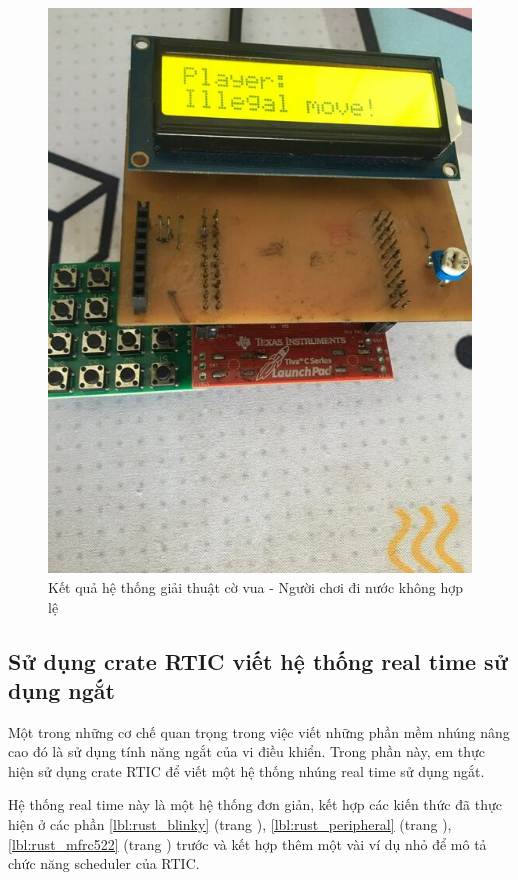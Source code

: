 \begin{figure}[ht]
\centering
\includegraphics[scale=0.4]{images/chess_illegal.jpg}
\caption{Kết quả hệ thống giải thuật cờ vua - Người chơi đi nước không hợp lệ}
\label{fig:chess_illegal}
\end{figure}

\clearpage
\subsection{Sử dụng crate RTIC viết hệ thống real time sử dụng ngắt}\label{lbl:rust_rtic}
Một trong những cơ chế quan trọng trong việc viết những phần mềm nhúng nâng cao đó là sử dụng tính năng ngắt của vi điều khiển.
Trong phần này, em thực hiện sử dụng crate RTIC \cite{rtic_website} để viết một hệ thống nhúng real time sử dụng ngắt.

Hệ thống real time này là một hệ thống đơn giản, kết hợp các kiến thức đã thực hiện ở các phần \ref{lbl:rust_blinky} (trang \pageref{lbl:rust_blinky}), \ref{lbl:rust_peripheral} (trang \pageref{lbl:rust_peripheral}), \ref{lbl:rust_mfrc522} (trang \pageref{lbl:rust_mfrc522}) trước và kết hợp thêm một vài ví dụ nhỏ để mô tả chức năng scheduler của RTIC.

